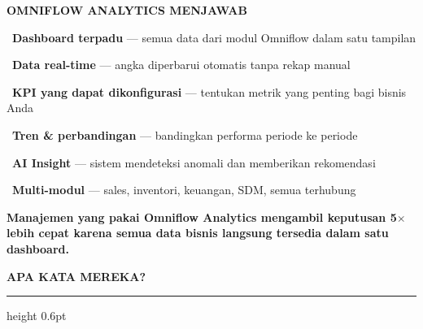 \documentclass[a4paper]{article}
\newcommand{\sectiontitle}[1]{%
    \vspace{10pt}%
    {\fontsize{13}{16}\selectfont\bfseries\color{BlueDark} #1}\par\vspace{3pt}%
    {\color{BluePrimary}\hrule height 0.6pt}\par\vspace{8pt}%
}
\begin{document}
\begin{minipage}[t]{0.485\textwidth}
    \colorbox{IndigoPrimary}{%
        \begin{minipage}{\dimexpr\textwidth-14pt}
            \vspace{5pt}
            {\fontsize{10}{13}\selectfont\bfseries\color{White} OMNIFLOW ANALYTICS MENJAWAB}
            \vspace{5pt}
        \end{minipage}}
    \vspace{6pt}

    {\fontsize{9.5}{13}\selectfont\color{TextDark}%
    \textbullet\ \textbf{Dashboard terpadu} --- semua data dari modul Omniflow dalam satu tampilan\par\vspace{4pt}%
    \textbullet\ \textbf{Data real-time} --- angka diperbarui otomatis tanpa rekap manual\par\vspace{4pt}%
    \textbullet\ \textbf{KPI yang dapat dikonfigurasi} --- tentukan metrik yang penting bagi bisnis Anda\par\vspace{4pt}%
    \textbullet\ \textbf{Tren \& perbandingan} --- bandingkan performa periode ke periode\par\vspace{4pt}%
    \textbullet\ \textbf{AI Insight} --- sistem mendeteksi anomali dan memberikan rekomendasi\par\vspace{4pt}%
    \textbullet\ \textbf{Multi-modul} --- sales, inventori, keuangan, SDM, semua terhubung}%
\end{minipage}

\vspace{8pt}

{\setlength{\fboxsep}{7pt}\setlength{\fboxrule}{0pt}%
\noindent\colorbox{IndigoPrimary}{%
    \begin{minipage}{\dimexpr\textwidth-2\fboxsep\relax}
        \centering
        {\fontsize{9.5}{12}\selectfont\bfseries\color{White}
        Manajemen yang pakai Omniflow Analytics mengambil keputusan \textbf{5$\times$ lebih cepat} karena semua data bisnis langsung tersedia dalam satu dashboard.}
    \end{minipage}}}

\vspace{8pt}
\sectiontitle{APA KATA MEREKA?}
\end{document}
